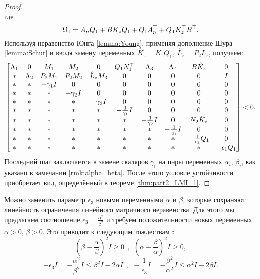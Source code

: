 \begin{proof}
\begin{equation}
	\end{equation}
	где
	\begin{equation}
		{\Omega}_1={A}_n{Q}_1+{B}{K}_z{Q}_1+{Q}_1{A}_n^\top+{Q}_1{K}_z^\top{B}^\top.
	\end{equation}
	Используя неравенство Юнга \ref{lemma:Young}, применяя дополнение Шура {\ref{lemma:Schur}} и вводя замену переменных $\hat{{K}}_z={K}_z{Q}_1$, $\hat{{L}}_z={P}_2{L}_z$, получаем:
	\begin{equation}
		\label{eq:thm3_LMI_before_alpha_beta}
		\begin{bmatrix}
			{\Lambda}_1 & 0 & {M}_1 & {M}_2&0 & {Q}_1{N}_1^\top & {\Lambda}_3& {\Lambda}_4 & {B}\hat{{K}}_z & 0\\
			* & {\Lambda}_2 & {P}_2{M}_1 & {P}_2{M}_2 & \hat{{L}}_z{M}_3& 0& 0&0&0&{I} \\
			* & * & -\gamma_1{I} & 0&0&0&0&0&0&0\\
			* & * &*  & -\gamma_2{I}&0&0&0&0&0&0\\
			*& * & * &*  & -\gamma_3{I}&0&0&0&0&0\\
			* &* & * & * & *&-\frac{1}{\gamma_1}{I}&0&0&0&0\\
			* & * & * &*& *&*&-\frac{1}{\gamma_2}{I}& 0&{N}_2\hat{{K}}_z&0\\
			*&*&* &* & * & * & *&-\frac{1}{\gamma_3}{I}&0&0\\
			* & * & *&*&* & *&*&*&-\frac{1}{\epsilon_1}{Q}_1&0\\
			* & * & * & *&*&*&*&*&*&-\epsilon_1{Q}_1\\
		\end{bmatrix}<0.
	\end{equation}
	Последний шаг заключается в замене скаляров $\gamma_i$ на пары переменных $\alpha_i$, $\beta_i$, как указано в замечании \ref{rmk:alpha_beta}. После этого условие устойчивости приобретает вид, определённый в теореме \ref{thm:part2_LMI_1}.
\end{proof}
\begin{remark}
	\label{rmk:alpha_beta}
	Можно заменить параметр $\epsilon_3$ новыми переменными $\alpha$ и $\beta$, которые сохраняют линейность ограничения линейного матричного неравенства. Для этого мы предлагаем соотношение $\epsilon_3=\frac{\alpha^2}{\beta^2}$ и требуем положительности новых переменных $\alpha>0$, $\beta>0$. Это приводит к следующим тождествам \cite{KHELOUFI2016}:
	\begin{equation}
		\label{eq:apha_beta_rm_eq1}
		\left(\beta-\frac{\alpha}{\beta}\right)^2 {I} \geq 0 \ \ , \ \  \left(\alpha-\frac{\beta}{\alpha}\right)^2 {I} \geq 0,
	\end{equation}
	\begin{equation}
		\label{eq:apha_beta_rm_eq2}
		-\epsilon_3 {I} = -\frac{\alpha^2}{\beta^2}{I} \leq \beta^2{I}-2\alpha {I} \ \ , \ \  -\frac{1}{\epsilon_3} {I} = -\frac{\beta^2}{\alpha^2}{I} \leq \alpha^2{I}-2\beta {I} .
	\end{equation}
\end{remark}
